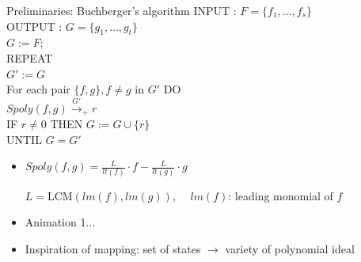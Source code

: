 \documentclass[xcolor=dvipsnames]{beamer}
\newcommand{\bi}{\begin{itemize}}
\newcommand{\ei}{\end{itemize}}
\begin{document}
\begin{frame}{\large{Preliminaries: Buchberger's algorithm}}
 INPUT : $F = \{f_1, \dots, f_s\}$\\
 OUTPUT : $G = \{g_1,\dots ,g_t\}$\\ %
  $G:= F$; \\
  REPEAT\\
  \hspace{0.1in} $G' := G$\\
  \hspace{0.1in} For each pair $\{f, g\}, f \neq g$ in $G'$ DO\\
\hspace{0.2in}  $Spoly(f, g) \stackrel{G'}{\textstyle\longrightarrow}_+
r$ \\
\hspace{0.2in}  IF $r \neq 0$ THEN $G:= G \cup \{r\}$ \\
UNTIL $G = G'$
\pause
\bi
\item $Spoly(f,g)=\frac{L}{lt(f)}\cdot f - \frac{L}{lt(g)}\cdot g$\par
$L = \text{LCM}(lm(f), lm(g))$, ~~$lm(f)$: leading monomial of $f$
\item Animation 1...
\pause
\item Inspiration of mapping: set of states $\to$ \alert{variety} of polynomial ideal
\ei
\end{frame}
\end{document}
